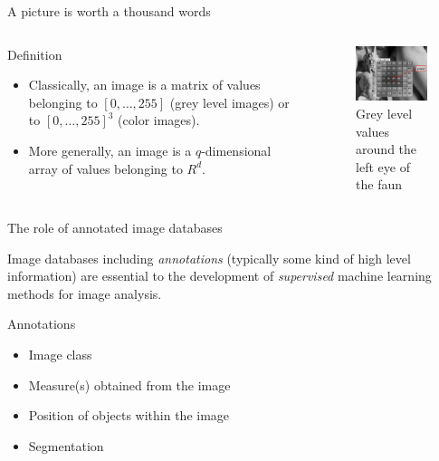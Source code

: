 \documentclass[xcolor=pdftex,dvipsnames,table,mathserif]{beamer}
\begin{document}
\begin{frame}{A picture is worth a thousand words}

  \begin{columns}
    \begin{column}{.5\textwidth}
      \begin{block}{Definition}
        \begin{itemize}
        \item Classically, an image is a matrix of values belonging to $[0, \ldots, 255]$ (grey level images) or to $[0, \ldots, 255]^3$ (color images).
        \item More generally, an image is a $q$-dimensional array of values belonging to $R^d$.
        \end{itemize}
      \end{block}

    \end{column}

    \begin{column}{.5\textwidth}
      \begin{figure}
        \centering
        \includegraphics[width=5cm]{faune.png}\\
        \tiny{Grey level values around the left eye of the faun}
      \end{figure}

    \end{column}
  \end{columns}

\end{frame}


\begin{frame}{The role of annotated image databases}

  Image databases including \emph{annotations} (typically some kind of high level information) are essential to the development of \emph{supervised} machine learning methods for image analysis.

  \begin{block}{Annotations}
    \begin{itemize}
    \item Image class
    \item Measure(s) obtained from the image
    \item Position of objects within the image
    \item Segmentation
    \end{itemize}
  \end{block}

\end{frame}
\end{document}
